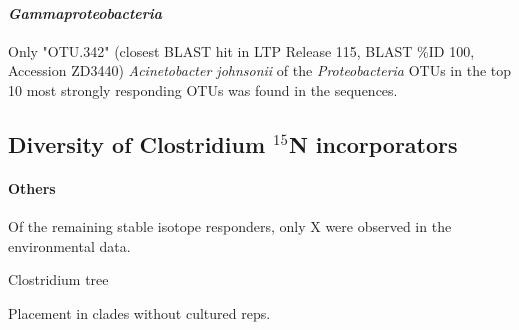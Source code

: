 \paragraph{\textit{Gammaproteobacteria}}
Only "OTU.342" (closest BLAST hit in LTP Release 115, BLAST \%ID 100, Accession ZD3440) \textit{Acinetobacter johnsonii} of the \textit{Proteobacteria} OTUs in the top 10 most strongly responding OTUs was found in the \citet{Garcia_Pichel_2013} sequences. %
\subsection{Diversity of Clostridium $^{15}$N incorporators}
\paragraph{Others}
Of the remaining stable isotope responders, only X were observed in the environmental data.

Clostridium tree

Placement in clades without cultured reps.